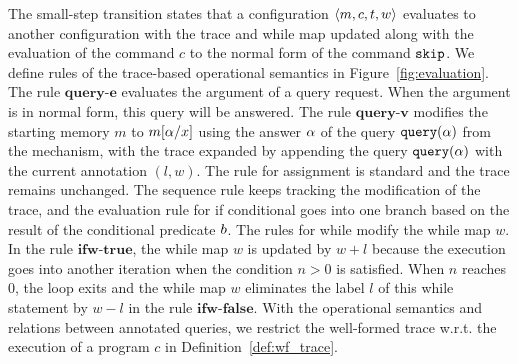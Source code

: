 \documentclass[a4paper,11pt]{article}
\begin{document}
%
The small-step transition states that a configuration $\langle m, c, t, w \rangle$ evaluates to another configuration with the trace and while map updated along with the evaluation of the command $c$ to the normal form of the command $\mathtt{skip}$.  
We define rules of the trace-based operational semantics in Figure~\ref{fig:evaluation}.
%
%
The rule $\textbf{query-e}$ evaluates the argument of a query request. When the argument is in normal form, this query will be answered.
%
The rule $\textbf{query-v}$ modifies the starting memory $m$ to $m[\alpha/x]$ using the answer $\alpha$ of the query ${\tt query}(\alpha)$ from the mechanism, 
with the trace expanded by appending the query ${\tt query}(\alpha)$ with the current annotation $(l,w)$. 
%
The rule for assignment is standard and the trace remains unchanged.%
The sequence rule keeps tracking the modification of the trace, and the evaluation rule for if conditional goes into one branch based on the result of the conditional predicate $b$. 
%
The rules for while modify the while map $w$. 
In the rule $\textbf{ifw-true}$, the while map $w$ is updated by $w + l$ because the execution goes into another iteration when the condition $n >0$ is satisfied. 
%
When $n$ reaches $0$, the loop exits and the while map $w$ eliminates the label $l$ of this while statement by $w - l$ in the rule $\textbf{ifw-false}$.  
With the operational semantics and relations between annotated queries, we restrict the well-formed trace w.r.t. the execution of a program $c$ in Definition~\ref{def:wf_trace}.
%
%
%
%
\end{document}
